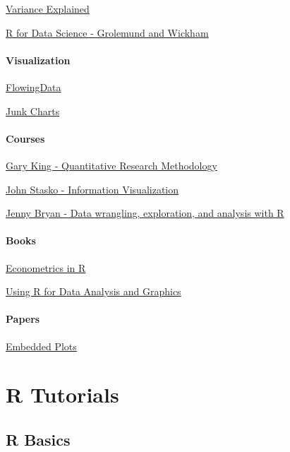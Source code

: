 \documentclass[]{book}
\begin{document}
\href{http://varianceexplained.org/RData/resources/}{Variance Explained}

\href{http://r4ds.had.co.nz/}{R for Data Science - Grolemund and
Wickham}

\subsection*{Visualization}\label{visualization}

\href{}{FlowingData}

\href{http://junkcharts.typepad.com/}{Junk Charts}

\subsection*{Courses}\label{courses}

\href{http://projects.iq.harvard.edu/gov2001/}{Gary King - Quantitative
Research Methodology}

\href{http://www.cc.gatech.edu/~stasko/7450/}{John Stasko - Information
Visualization}

\href{http://stat545.com/}{Jenny Bryan - Data wrangling, exploration,
and analysis with R}

\subsection*{Books}\label{books}

\href{https://cran.r-project.org/doc/contrib/Farnsworth-EconometricsInR.pdf}{Econometrics
in R}

\href{ftp://cran.r-project.org/pub/R/doc/contrib/usingR.pdf}{Using R for
Data Analysis and Graphics}

\subsection*{Papers}\label{papers}

\href{http://vita.had.co.nz/papers/embedded-plots.pdf}{Embedded Plots}

\part{R Tutorials}\label{part-r-tutorials}

\hypertarget{intro}{\chapter{R Basics}\label{intro}}
\end{document}
